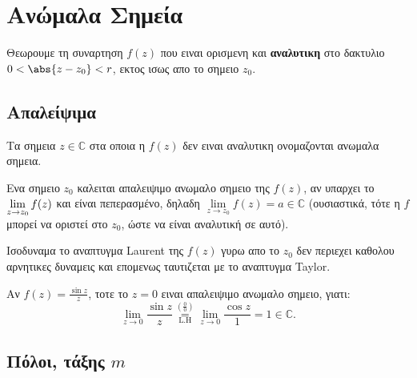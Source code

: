 




\everymath{\displaystyle}
\thispagestyle{empty}






\chapter*{Ανώμαλα Σημεία}

\vspace{\baselineskip} 

Θεωρουμε τη συναρτηση $f(z)$ που ειναι ορισμενη και \textbf{αναλυτικη} στο δακτυλιο 
$0<\abs{z-z_0}<r$, εκτος ισως απο το σημειο $z_0$. 


\section*{Απαλείψιμα}

\begin{dfn}
  Τα σημεια $z\in \mathbb{C}$ στα οποια η $f(z)$ δεν ειναι αναλυτικη ονομαζονται 
  \textcolor{Col1}{ανωμαλα σημεια}.
\end{dfn}

\begin{dfn} 
  Ενα σημειο $z_0$ καλειται \textcolor{Col1}{απαλειψιμο} ανωμαλο σημειο της $f(z)$, 
  αν υπαρχει το $\lim\limits_{\smash{z\to z_0}}f(z)$ και είναι πεπερασμένο, 
  δηλαδη $\lim\limits_{z\to z_0}f(z)=a\in \mathbb{C}$ (ουσιαστικά, τότε η $f$
  μπορεί να οριστεί στο $z_{0}$, ώστε να είναι αναλυτική σε αυτό).

  \begin{myitemize}
    \item Ισοδυναμα το αναπτυγμα Laurent της $f(z)$ \textcolor{Col2}{γυρω απο το $z_0$} 
      δεν περιεχει καθολου αρνητικες δυναμεις και επομενως ταυτιζεται με το αναπτυγμα 
      Taylor.
  \end{myitemize} 
\end{dfn}

\begin{example}
  Αν $f(z)=\frac{\sin z}{z}$, τοτε το $z=0$ ειναι απαλειψιμο ανωμαλο σημειο, γιατι:
  \[
    \lim\limits_{z\to 0}\frac{\sin z}{z} 
    \overset{(\frac{0}{0})}{\underset{\text{L.H}}{=}} 
    \lim\limits_ {z\to 0}\frac{\cos z}{1}=1\in \mathbb{C}.
  \]
\end{example}

\section*{Πόλοι, τάξης \ensuremath{ m }}


